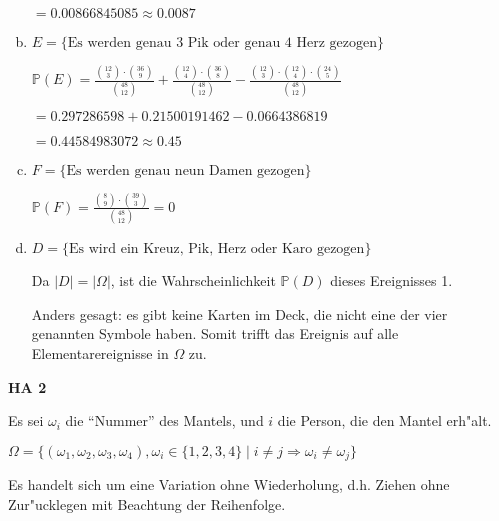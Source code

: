 \documentclass[a4paper,12pt]{article}
\newcommand{\Aufgabe}[1]{
        {
        \vspace*{0.5cm}
        \textbf{HA #1}
        \vspace*{0.2cm}
    }
}
\begin{document}
\begin{enumerate}[(a)]
        $ = 0.00866845085 \approx 0.0087 $

        \item
        $ E = \{\text{Es werden genau 3 Pik oder genau 4 Herz gezogen}\} $

        $ \displaystyle \mathbb{P}(E) = \frac{\binom{12}{3} \cdot \binom{36}{9}}{\binom{48}{12}} + \frac{\binom{12}{4} \cdot \binom{36}{8}}{\binom{48}{12}} - \frac{\binom{12}{3} \cdot \binom{12}{4} \cdot \binom{24}{5}}{\binom{48}{12}} $

        $ = 0.297286598 + 0.21500191462 - 0.0664386819 $

        $ = 0.44584983072 \approx 0.45 $

        \item
        $ F = \{\text{Es werden genau neun Damen gezogen}\} $

        $ \displaystyle \mathbb{P}(F) = \frac{\binom{8}{9} \cdot \binom{39}{3}}{\binom{48}{12}} = 0 $

        \item
        $ D = \{\text{Es wird ein Kreuz, Pik, Herz oder Karo gezogen}\} $

        Da $ |D| = |\Omega| $, ist die Wahrscheinlichkeit $ \mathbb{P}(D) $ dieses Ereignisses 1.

        Anders gesagt: es gibt keine Karten im Deck, die nicht eine der vier genannten Symbole haben. 
        Somit trifft das Ereignis auf alle Elementarereignisse in $ \Omega $ zu.
    \end{enumerate}

    \Aufgabe{2}
    
    Es sei $ \omega_i $ die ``Nummer'' des Mantels, und $ i $ die Person, die den Mantel erh"alt.

    $ \Omega = \{(\omega_1, \omega_2, \omega_3, \omega_4), \omega_i \in \{1, 2, 3, 4\} \mid i \neq j \Rightarrow \omega_i \neq \omega_j\} $

    \bigskip

    Es handelt sich um eine Variation ohne Wiederholung, d.h. Ziehen ohne Zur"ucklegen mit Beachtung der Reihenfolge.
\end{document}
